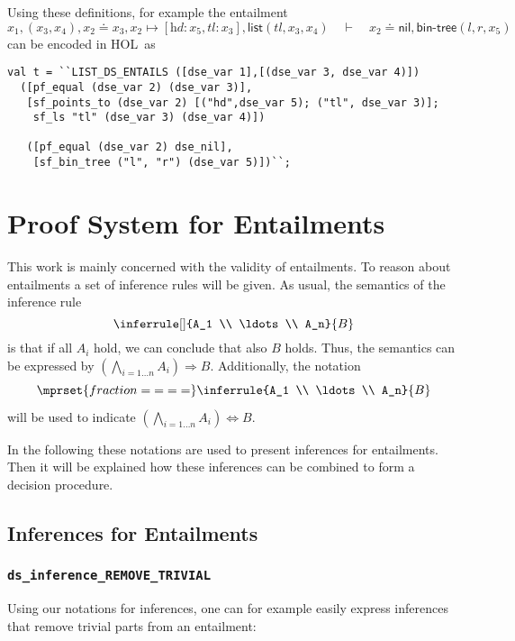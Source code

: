 \documentclass{scrartcl}
\theoremstyle{definition}
\newcommand{\HOL}{{\textsc{HOL}}}
\newcommand{\nil}{{\textsf{nil}}}
\newcommand{\pfequal}[2]{\ensuremath{#1 \doteq #2}}
\newcommand{\sfpointsto}[2]{#1 \mapsto [#2]}
\newcommand{\sfbintree}{{\textsf{bin-tree}}}
\newcommand{\sflist}{{\textsf{list}}}
\newcommand{\entailment}[2]{#1 \quad\vdash\quad #2}
\newcommand{\eqinferstyle}{
\mprset{fraction={={\raisebox{0pt}[5pt][5pt]{=}}=}}}
\begin{document}
Using these definitions, for example the entailment
\[\entailment{x_1,(x_3,x_4), \pfequal {x_2} {x_3},
  \sfpointsto{x_2} {\textit{hd}:x_5, \textit{tl}:x_3},
  \sflist(\textit{tl}, x_3, x_4)}{\pfequal{x_2} \nil, \sfbintree(l,r,x_5)}\]
can be encoded in \HOL\ as
\begin{verbatim}
val t = ``LIST_DS_ENTAILS ([dse_var 1],[(dse_var 3, dse_var 4)])
  ([pf_equal (dse_var 2) (dse_var 3)],
   [sf_points_to (dse_var 2) [("hd",dse_var 5); ("tl", dse_var 3)];
    sf_ls "tl" (dse_var 3) (dse_var 4)])

   ([pf_equal (dse_var 2) dse_nil],
    [sf_bin_tree ("l", "r") (dse_var 5)])``;
\end{verbatim}


\section{Proof System for Entailments}

This work is mainly concerned with the validity of
entailments. To reason about entailments a set of inference rules will be
given. As usual, the semantics of the inference rule
%
\[
\inferrule[]{A_1 \\ \ldots \\ A_n}{B}
\]
%
is that if all $A_i$ hold, we can conclude that also $B$
holds. Thus, the semantics can be expressed by $(\bigwedge_{i=1 \ldots n} A_i) \Rightarrow B$.
Additionally, the notation
\[
\eqinferstyle
\inferrule{A_1 \\ \ldots \\ A_n}{B}
\]
will be used to indicate  $(\bigwedge_{i=1 \ldots n} A_i) \Leftrightarrow B$.

In the following these notations are used to present inferences for
entailments. Then it will be explained how these inferences can be combined
to form a decision procedure.

\subsection{Inferences for Entailments}

\subsubsection{\texttt{ds\_inference\_REMOVE\_TRIVIAL}}

Using our notations for inferences, one can for example easily express inferences that
remove trivial parts from an entailment:
\end{document}
